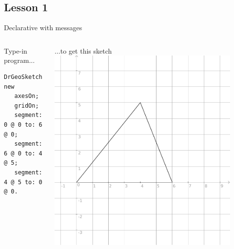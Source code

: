 \documentclass{beamer}
\begin{document}
\subsection{Lesson 1}
\begin{frame}[fragile]{Declarative with messages\cite{lesson1}}
\begin{columns}[t]
  \begin{column}{0.5\textwidth}
    Type-in program...
    \vspace*{10pt}
    \fontsize{9pt}{8pt}\selectfont
    \begin{lstlisting}[language=Smalltalk]
DrGeoSketch new
   axesOn;
   gridOn;
   segment: 0 @ 0 to: 6 @ 0;
   segment: 6 @ 0 to: 4 @ 5;
   segment: 4 @ 5 to: 0 @ 0.
 \end{lstlisting}
\end{column}    
    \begin{column}{0.5\textwidth}
      ...to get this sketch
      \includegraphics[width=0.9\textwidth]{lesson1.pdf}
    \end{column}  
  \end{columns}  
\end{frame}
%
\end{document}
